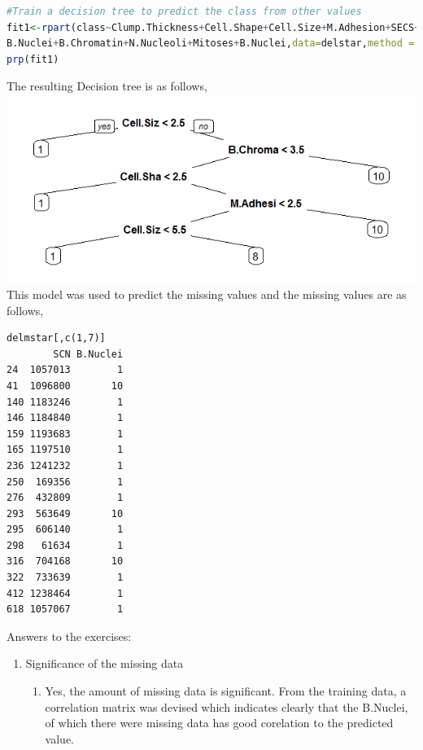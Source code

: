 \documentclass{article}
\begin{document}
\begin{enumerate}
\begin{enumerate}
\begin{enumerate}
\begin{lstlisting}[language=R]
#Train a decision tree to predict the class from other values
fit1<-rpart(class~Clump.Thickness+Cell.Shape+Cell.Size+M.Adhesion+SECS+
B.Nuclei+B.Chromatin+N.Nucleoli+Mitoses+B.Nuclei,data=delstar,method = "class")
prp(fit1)
\end{lstlisting}
The resulting Decision tree is as follows,\\
\includegraphics[scale=0.5]{dtreenas.png}
\\This model was used to predict the missing values and the missing values are as follows,
\begin{verbatim}
delmstar[,c(1,7)]
        SCN B.Nuclei
24  1057013        1
41  1096800       10
140 1183246        1
146 1184840        1
159 1193683        1
165 1197510        1
236 1241232        1
250  169356        1
276  432809        1
293  563649       10
295  606140        1
298   61634        1
316  704168       10
322  733639        1
412 1238464        1
618 1057067        1
\end{verbatim}
\end{enumerate}
\end{enumerate}
Answers to the exercises:
\begin{enumerate}
\item Significance of the missing data
\begin{enumerate}
\item Yes, the amount of missing data is significant. From the training data, a correlation matrix was devised which indicates clearly that the B.Nuclei, of which there were missing data has good corelation to the predicted value.\\

\end{enumerate}
\end{enumerate}
\end{enumerate}
\end{document}
